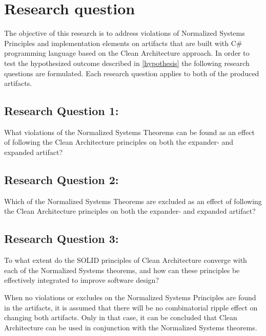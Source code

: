 \section{Research question} \label{sec:research_questions}

The objective of this research is to address violations of Normalized Systems Principles
and implementation elements on artifacts that are built with C\# programming language
based on the Clean Architecture approach. In order to test the hypothesized outcome
described in \ref{hypothesis} the following research questions are formulated. Each
research question applies to both of the produced artifacts.

\subsection*{Research Question 1:} \label{rq1}
What violations of the Normalized Systems Theorems can be found as an effect of
following the Clean Architecture principles on both the expander- and expanded artifact?

\subsection*{Research Question 2:} \label{rq2}
Which of the Normalized Systems Theorems are excluded as an effect of following the
Clean Architecture principles on both the expander- and expanded artifact?

\subsection*{Research Question 3:} \label{rq3}
To what extent do the SOLID principles of Clean Architecture converge with each of the
Normalized Systems theorems, and how can these principles be effectively integrated to
improve software design?

When no violations or excludes on the Normalized Systems Principles are found in the
artifacts, it is assumed that there will be no combinatorial ripple effect on changing
both artifacts. Only in that case, it can be concluded that Clean Architecture can be
used in conjunction with the Normalized Systems theorems. 